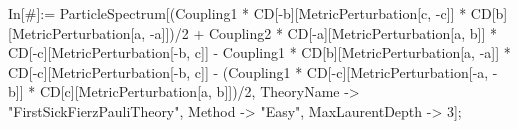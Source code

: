 In[\#]:= ParticleSpectrum[(Coupling1 * CD[-b][MetricPerturbation[c, -c]] * CD[b][MetricPerturbation[a, -a]])/2 + Coupling2 * CD[-a][MetricPerturbation[a, b]] * CD[-c][MetricPerturbation[-b, c]] - Coupling1 * CD[b][MetricPerturbation[a, -a]] * CD[-c][MetricPerturbation[-b, c]] - (Coupling1 * CD[-c][MetricPerturbation[-a, -b]] * CD[c][MetricPerturbation[a, b]])/2, TheoryName -> "FirstSickFierzPauliTheory", Method -> "Easy", MaxLaurentDepth -> 3]; 
